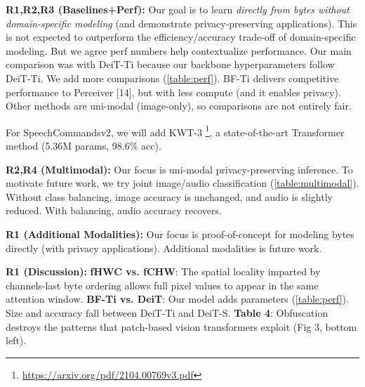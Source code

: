 \documentclass[10pt,twocolumn,letterpaper]{article}
\begin{document}

\thispagestyle{empty}


\textbf{R1,R2,R3 (Baselines+Perf):} Our goal is to learn \emph{directly from bytes without domain-specific modeling} (and demonstrate privacy-preserving applications). This  is not expected to outperform the efficiency/accuracy trade-off of domain-specific modeling. But we agree perf numbers help contextualize performance. Our main comparison was with DeiT-Ti because our backbone hyperparameters follow DeiT-Ti. We add more comparisons (\autoref{table:perf}). BF-Ti delivers competitive performance to Perceiver [14], but with less compute (and it enables privacy). Other methods are uni-modal (image-only), so comparisons are not entirely fair.

For SpeechCommandsv2, we will add KWT-3 \footnote{\url{https://arxiv.org/pdf/2104.00769v3.pdf}}, a state-of-the-art Transformer method (5.36M params, 98.6\% acc). %

\textbf{R2,R4 (Multimodal):} Our focus is uni-modal privacy-preserving inference. To motivate future work, we try joint image/audio classification (\autoref{table:multimodal}). Without class balancing, image accuracy is unchanged, and audio is slightly reduced. With balancing, audio accuracy recovers.

\textbf{R1 (Additional Modalities):} Our focus is proof-of-concept for modeling bytes directly (with privacy applications). Additional modalities is future work.

\textbf{R1 (Discussion):} \textbf{fHWC vs. fCHW}: The spatial locality imparted by channels-last byte ordering allows full pixel values to appear in the same attention window. \textbf{BF-Ti vs. DeiT}: Our model adds parameters (\autoref{table:perf}). Size and accuracy fall between DeiT-Ti and DeiT-S. \textbf{Table 4}: Obfuscation destroys the patterns that patch-based vision transformers exploit (Fig 3, bottom left).
\end{document}
